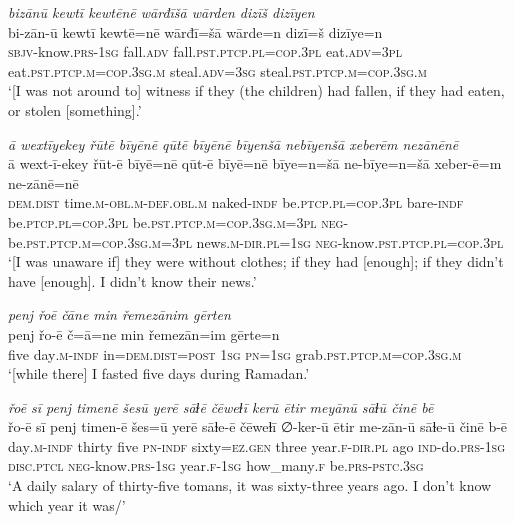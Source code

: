 \ea \label{ŽM.29}
\textit{bizānū kewtī kewtēnē wārđīšā wārden dizīš dizīyen} \\ 
\gll bi-zān-ū kewtī kewtē=nē wārđī=šā wārde=n dizī=š dizīye=n \\ 
 \textsc{sbjv-}know\textsc{.prs}\textsc{-\textsc{1sg}} fall\textsc{.adv} fall\textsc{.pst}\textsc{.ptcp}\textsc{.pl}\textsc{=cop}\textsc{.3pl} eat\textsc{.adv}\textsc{=3pl} eat\textsc{.pst}\textsc{.ptcp}\textsc{.m}\textsc{=cop}\textsc{.3sg}\textsc{.m} steal\textsc{.adv}\textsc{=3sg} steal\textsc{.pst}\textsc{.ptcp}\textsc{.m}\textsc{=cop}\textsc{.3sg}\textsc{.m} \\ 
\glt `[I was not around to] witness if they (the children) had fallen, if they had eaten, or stolen [something].'
\z 
 
\ea \label{ŽM.30}
\textit{ā wextīyekey řūtē bīyēnē qūtē bīyēnē bīyenšā nebīyenšā xeberēm nezānēnē} \\ 
\gll ā wext-ī-ekey řūt-ē bīyē=nē qūt-ē bīyē=nē bīye=n=šā ne-bīye=n=šā xeber-ē=m ne-zānē=nē \\ 
 \textsc{dem.dist} time\textsc{.m}\textsc{-obl}\textsc{.m}\textsc{-def}\textsc{.obl}\textsc{.m} naked\textsc{-indf} be\textsc{.ptcp}\textsc{.pl}\textsc{=cop}\textsc{.3pl} bare\textsc{-indf} be\textsc{.ptcp}\textsc{.pl}\textsc{=cop}\textsc{.3pl} be\textsc{.pst}\textsc{.ptcp}\textsc{.m}\textsc{=cop}\textsc{.3sg}\textsc{.m}\textsc{=3pl} \textsc{neg-}be\textsc{.pst}\textsc{.ptcp}\textsc{.m}\textsc{=cop}\textsc{.3sg}\textsc{.m}\textsc{=3pl} news\textsc{.m}\textsc{-dir}\textsc{.pl}\textsc{=\textsc{1sg}} \textsc{neg-}know\textsc{.pst}\textsc{.ptcp}\textsc{.pl}\textsc{=cop}\textsc{.3pl} \\ 
\glt `[I was unaware if] they were without clothes; if they had [enough]; if they didn’t have [enough]. I didn't know their news.'
\z 
 
\ea \label{ŽM.47}
\textit{penj řoē čāne min řemezānim gērten} \\ 
\gll penj řo-ē č=ā=ne min řemezān=im gērte=n \\ 
 five day\textsc{.m}\textsc{-indf} in=\textsc{dem.dist}\textsc{=\textsc{post}} \textsc{1sg} \textsc{pn}\textsc{=\textsc{1sg}} grab\textsc{.pst}\textsc{.ptcp}\textsc{.m}\textsc{=cop}\textsc{.3sg}\textsc{.m} \\ 
\glt `[while there] I fasted five days during Ramadan.'
\z 
 
\ea \label{ŽM.49}
\textit{řoē sī penj timenē šesū yerē sāɫē čēweɫī kerū ētir meyānū sāɫū činē bē} \\ 
\gll řo-ē sī penj timen-ē šes=ū yerē sāɫe-ē čēweɫī ∅-ker-ū ētir me-zān-ū sāɫe-ū činē b-ē \\ 
 day\textsc{.m}\textsc{-indf} thirty five \textsc{pn}\textsc{-indf} sixty\textsc{=ez.gen} three year\textsc{.f}\textsc{-dir}\textsc{.pl} ago \textsc{ind-}do\textsc{.prs}\textsc{-\textsc{1sg}} \textsc{disc}.\textsc{ptcl} \textsc{neg-}know\textsc{.prs}\textsc{-\textsc{1sg}} year\textsc{.f}\textsc{-\textsc{1sg}} how\_many\textsc{.f} be\textsc{.prs}\textsc{-pstc}\textsc{.3sg} \\ 
\glt `A daily salary of thirty-five tomans, it was sixty-three years ago. I don’t know which year it was/'
\z 
 

